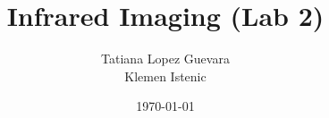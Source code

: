 \documentclass{article}
\begin{document}
\title{Infrared Imaging (Lab 2)}
\date {\today}
\author{Tatiana Lopez Guevara\\Klemen Istenic}
\maketitle




\end{document}
